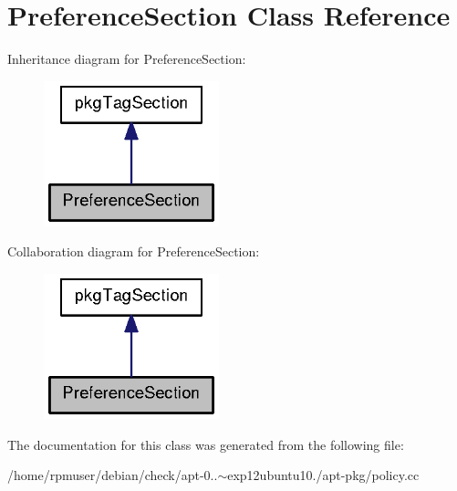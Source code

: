 \section{\-Preference\-Section \-Class \-Reference}
\label{classPreferenceSection}


\-Inheritance diagram for \-Preference\-Section\-:
\nopagebreak
\begin{figure}[H]
\begin{center}
\leavevmode
\includegraphics[width=144pt]{classPreferenceSection__inherit__graph}
\end{center}
\end{figure}


\-Collaboration diagram for \-Preference\-Section\-:
\nopagebreak
\begin{figure}[H]
\begin{center}
\leavevmode
\includegraphics[width=144pt]{classPreferenceSection__coll__graph}
\end{center}
\end{figure}


\-The documentation for this class was generated from the following file\-:\begin{DoxyCompactItemize}
\item 
/home/rpmuser/debian/check/apt-\/0..$\sim$exp12ubuntu10./apt-\/pkg/policy.\-cc\end{DoxyCompactItemize}
